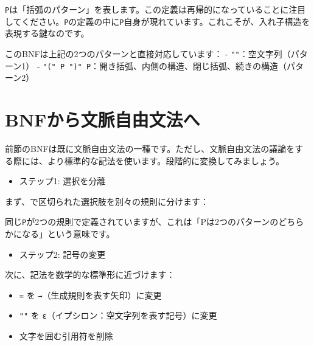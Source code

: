 \texttt{P}は「括弧のパターン」を表します。この定義は再帰的になっていることに注目してください。\texttt{P}の定義の中に\texttt{P}自身が現れています。これこそが、入れ子構造を表現する鍵なのです。

このBNFは上記の2つのパターンと直接対応しています： -
\texttt{""}：空文字列（パターン1） -
\texttt{"("\ P\ ")"\ P}：開き括弧、内側の構造、閉じ括弧、続きの構造（パターン2）

\hypertarget{chapter4-bnfux304bux3089ux6587ux8108ux81eaux7531ux6587ux6cd5ux3078}{%
\section{BNFから文脈自由文法へ}\label{chapter4-bnfux304bux3089ux6587ux8108ux81eaux7531ux6587ux6cd5ux3078}}

前節のBNFは既に文脈自由文法の一種です。ただし、文脈自由文法の議論をする際には、より標準的な記法を使います。段階的に変換してみましょう。

\begin{itemize}
\tightlist
\item
  ステップ1: 選択を分離
\end{itemize}

まず、\texttt{\textbar{}}で区切られた選択肢を別々の規則に分けます：

\begin{Shaded}
\begin{Highlighting}[]
\NormalTok{ = }\KeywordTok{;}
\NormalTok{ = }\KeywordTok{;}
\end{Highlighting}
\end{Shaded}

同じ\texttt{P}が2つの規則で定義されていますが、これは「Pは2つのパターンのどちらかになる」という意味です。

\begin{itemize}
\tightlist
\item
  ステップ2: 記号の変更
\end{itemize}

次に、記法を数学的な標準形に近づけます：

\begin{itemize}
\tightlist
\item
  \texttt{=} を \texttt{→}（生成規則を表す矢印）に変更
\item
  \texttt{""} を \texttt{ε}（イプシロン：空文字列を表す記号）に変更
\item
  文字を囲む引用符を削除
\end{itemize}


